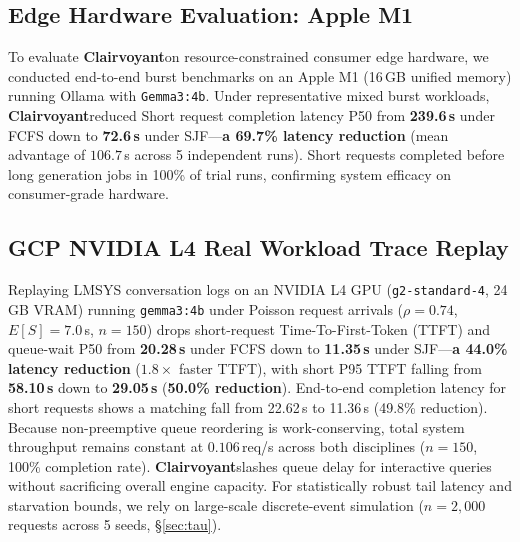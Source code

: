 \documentclass[10pt]{article}
\newcommand{\clairvoyant}{\textbf{Clairvoyant}}
\begin{document}
\subsection{Edge Hardware Evaluation: Apple M1}
\label{sec:edge}

To evaluate \clairvoyant on resource-constrained consumer edge hardware, we conducted end-to-end burst benchmarks on an Apple M1 (16\,GB unified memory) running Ollama with \texttt{Gemma3:4b}. Under representative mixed burst workloads, \clairvoyant reduced Short request completion latency P50 from \textbf{239.6\,s} under FCFS down to \textbf{72.6\,s} under SJF---\textbf{a 69.7\% latency reduction} (mean advantage of $106.7$\,s across 5 independent runs). Short requests completed before long generation jobs in 100\% of trial runs, confirming system efficacy on consumer-grade hardware.

\subsection{GCP NVIDIA L4 Real Workload Trace Replay}
\label{sec:trace}

Replaying LMSYS conversation logs on an NVIDIA L4 GPU (\texttt{g2-standard-4}, 24\,GB VRAM) running \texttt{gemma3:4b} under Poisson request arrivals ($\rho=0.74$, $E[S]=7.0$\,s, $n=150$) drops short-request Time-To-First-Token (TTFT) and queue-wait P50 from \textbf{20.28\,s} under FCFS down to \textbf{11.35\,s} under SJF---\textbf{a 44.0\% latency reduction} ($1.8\times$ faster TTFT), with short P95 TTFT falling from \textbf{58.10\,s} down to \textbf{29.05\,s} (\textbf{50.0\% reduction}). End-to-end completion latency for short requests shows a matching fall from 22.62\,s to 11.36\,s (49.8\% reduction). Because non-preemptive queue reordering is work-conserving, total system throughput remains constant at $0.106$\,req/s across both disciplines ($n=150$, 100\% completion rate). \clairvoyant slashes queue delay for interactive queries without sacrificing overall engine capacity. For statistically robust tail latency and starvation bounds, we rely on large-scale discrete-event simulation ($n=2{,}000$ requests across 5 seeds, \S\ref{sec:tau}).

\end{document}
